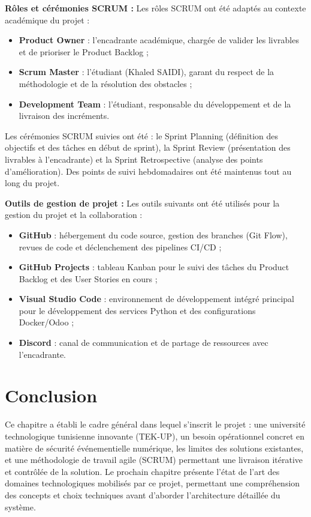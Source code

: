 \textbf{Rôles et cérémonies SCRUM :} Les rôles SCRUM ont été adaptés au contexte académique du projet :
\begin{itemize}
    \item \textbf{Product Owner} : l'encadrante académique, chargée de valider les livrables et de prioriser le Product Backlog ;
    \item \textbf{Scrum Master} : l'étudiant (Khaled SAIDI), garant du respect de la méthodologie et de la résolution des obstacles ;
    \item \textbf{Development Team} : l'étudiant, responsable du développement et de la livraison des incréments.
\end{itemize}

Les cérémonies SCRUM suivies ont été : le Sprint Planning (définition des objectifs et des tâches en début de sprint), la Sprint Review (présentation des livrables à l'encadrante) et la Sprint Retrospective (analyse des points d'amélioration). Des points de suivi hebdomadaires ont été maintenus tout au long du projet.

\textbf{Outils de gestion de projet :} Les outils suivants ont été utilisés pour la gestion du projet et la collaboration :
\begin{itemize}
    \item \textbf{GitHub} : hébergement du code source, gestion des branches (Git Flow), revues de code et déclenchement des pipelines CI/CD ;
    \item \textbf{GitHub Projects} : tableau Kanban pour le suivi des tâches du Product Backlog et des User Stories en cours ;
    \item \textbf{Visual Studio Code} : environnement de développement intégré principal pour le développement des services Python et des configurations Docker/Odoo ;
    \item \textbf{Discord} : canal de communication et de partage de ressources avec l'encadrante.
\end{itemize}

\section*{Conclusion}
Ce chapitre a établi le cadre général dans lequel s'inscrit le projet : une université technologique tunisienne innovante (TEK-UP), un besoin opérationnel concret en matière de sécurité événementielle numérique, les limites des solutions existantes, et une méthodologie de travail agile (SCRUM) permettant une livraison itérative et contrôlée de la solution. Le prochain chapitre présente l'état de l'art des domaines technologiques mobilisés par ce projet, permettant une compréhension des concepts et choix techniques avant d'aborder l'architecture détaillée du système.
